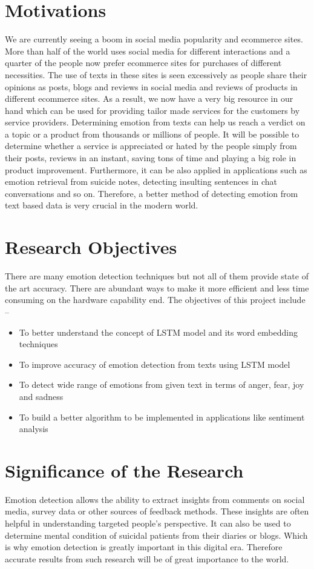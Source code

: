 \section{Motivations}

We are currently seeing a boom in social media popularity and ecommerce sites. More than half of the world uses social media for different interactions and a quarter of the people now prefer ecommerce sites for purchases of different necessities. The use of texts in these sites is seen excessively as people share their opinions as posts, blogs and reviews in social media and reviews of products in different ecommerce sites. As a result, we now have a very big resource in our hand which can be used for providing tailor made services for the customers by service providers. Determining emotion from texts can help us reach a verdict on a topic or a product from thousands or millions of people. It will be possible to determine whether a service is appreciated or hated by the people simply from their posts, reviews in an instant, saving tons of time and playing a big role in product improvement. Furthermore, it can be also applied in applications such as emotion retrieval from suicide notes, detecting insulting sentences in chat conversations and so on. Therefore, a better method of detecting emotion from text based data is very crucial in the modern world.

\section{Research Objectives}
There are many emotion detection techniques but not all of them provide state of
the art accuracy. There are abundant ways to make it more efficient and less time
consuming on the hardware capability end. The objectives of this project include –
\begin{itemize}
\item To better understand the concept of LSTM model and its word embedding techniques
\item To improve accuracy of emotion detection from texts using LSTM model
\item To detect wide range of emotions from given text in terms of anger, fear, joy and sadness 
\item To build a better algorithm to be implemented in applications like sentiment analysis
\end{itemize}

\section{Significance of the Research} 
Emotion detection allows the ability to extract insights from comments on social media, survey data or other sources of feedback methods. These insights are often helpful in understanding targeted people's perspective. It can also be used to determine mental condition of suicidal patients from their diaries or blogs. Which is why emotion detection is greatly important in this digital era. Therefore accurate results from such research will be of great importance to the world. 

